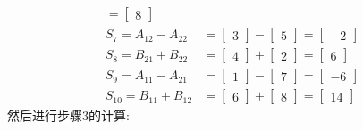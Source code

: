 \documentclass[a4paper,11pt]{article}
\begin{document}
\begin{align*}
	=
	\begin{bmatrix}
	8
	\end{bmatrix} \\	
	S_7 = A_{12}-A_{22} &=
	\begin{bmatrix}
	3
	\end{bmatrix}
	-
	\begin{bmatrix}
	5
	\end{bmatrix}
	=
	\begin{bmatrix}
	-2
	\end{bmatrix} \\	
	S_8 = B_{21}+B_{22} &=
	\begin{bmatrix}
	4
	\end{bmatrix}
	+
	\begin{bmatrix}
	2
	\end{bmatrix}
	=
	\begin{bmatrix}
	6
	\end{bmatrix} \\	
	S_9 = A_{11}-A_{21} &=
	\begin{bmatrix}
	1
	\end{bmatrix}
	-
	\begin{bmatrix}
	7
	\end{bmatrix}
	=
	\begin{bmatrix}
	-6
	\end{bmatrix} \\	
	S_{10} = B_{11}+B_{12} &=
	\begin{bmatrix}
	6
	\end{bmatrix}
	+
	\begin{bmatrix}
	8
	\end{bmatrix}
	=
	\begin{bmatrix}
	14
	\end{bmatrix}
\end{align*}
然后进行步骤3的计算:
\end{document}

